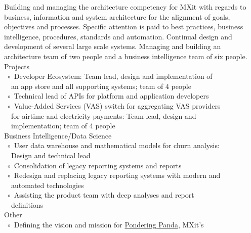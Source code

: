 \documentclass[10pt,a4paper,final]{columncv}
\begin{document}
\begin{cvenv}
  \cvitem{}{} %
  
         {Building and managing the architecture competency for MXit with regards to 
         business, information and system architecture for the alignment of goals, 
         objectives and processes. Specific attention is paid to best practices, business 
         intelligence, procedures, standards and automation. Continual design and 
         development of several large scale systems. Managing and building an architecture
         team of two people and a business intelligence team of six people.}
        {Projects \\
         ~$\circ$~Developer Ecosystem: Team lead, design and implementation of \\
         ~\phantom{$\circ$}~an app store and all supporting systems; team of 4 people \\
         ~$\circ$~Technical lead of APIs for platform and application developers \\
         ~$\circ$~Value-Added Services (VAS) switch for aggregating VAS providers \\
         ~\phantom{$\circ$}~for airtime and electricity payments: Team lead, design and \\
         ~\phantom{$\circ$}~implementation; team of 4 people \\
         Business Intelligence/Data Science \\
         ~$\circ$~User data warehouse and mathematical models for churn analysis: \\
         ~\phantom{$\circ$}~Design and technical lead \\
         ~$\circ$~Consolidation of legacy reporting systems and reports \\
         ~$\circ$~Redesign and replacing legacy reporting systems with modern and \\
         ~\phantom{$\circ$}~automated technologies \\
         ~$\circ$~Assisting the product team with deep analyses and report \\
         ~\phantom{$\circ$}~definitions \\
         Other \\
         ~$\circ$~Defining the vision and mission for \href{http://www.ponderingpanda.com/}{Pondering Panda}, MXit's\\
}
\end{cvenv}
\end{document}
